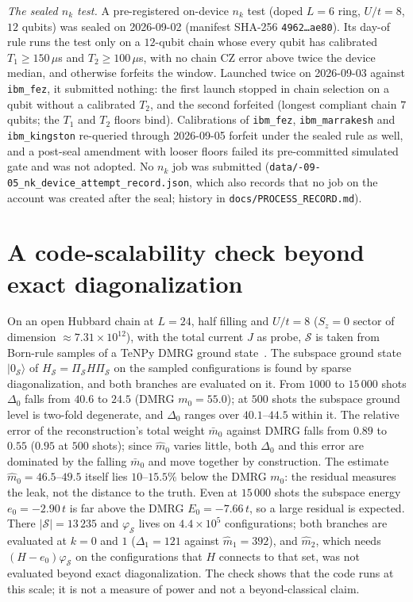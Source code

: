 \documentclass[aps,prb,onecolumn,superscriptaddress,longbibliography,floatfix]{revtex4-2}
\begin{document}
\emph{The sealed $n_k$ test.} A pre-registered on-device $n_k$ test (doped $L=6$ ring, $U/t=8$, $12$ qubits) was sealed on 2026-09-02 (manifest SHA-256 \texttt{4962\ldots ae80}). Its day-of rule runs the test only on a $12$-qubit chain whose every qubit has calibrated $T_1\ge150\,\mu$s and $T_2\ge100\,\mu$s, with no chain CZ error above twice the device median, and otherwise forfeits the window. Launched twice on 2026-09-03 against \texttt{ibm\_fez}, it submitted nothing: the first launch stopped in chain selection on a qubit without a calibrated $T_2$, and the second forfeited (longest compliant chain $7$ qubits; the $T_1$ and $T_2$ floors bind). Calibrations of \texttt{ibm\_fez}, \texttt{ibm\_marrakesh} and \texttt{ibm\_kingston} re-queried through 2026-09-05 forfeit under the sealed rule as well, and a post-seal amendment with looser floors failed its pre-committed simulated gate and was not adopted. No $n_k$ job was submitted (\texttt{data/-09-05\_nk\_device\_\allowbreak attempt\_record.json}, which also records that no job on the account was created after the seal; history in \texttt{docs/\allowbreak PROCESS\_RECORD.md}).

\section{A code-scalability check beyond exact diagonalization}
\label{app:L24}
\label{sec:L24}
On an open Hubbard chain at $L=24$, half filling and $U/t=8$ ($S_z=0$ sector of dimension ${\approx}7.31\times10^{12}$), with the total current $J$ as probe, $\mathcal S$ is taken from Born-rule samples of a TeNPy DMRG ground state~\cite{TeNPy2024}. The subspace ground state $|0_\mathcal S\rangle$ of $H_\mathcal S=\Pi_\mathcal S H\Pi_\mathcal S$ on the sampled configurations is found by sparse diagonalization, and both branches are evaluated on it. From $1000$ to $15\,000$ shots $\Delta_0$ falls from $40.6$ to $24.5$ (DMRG $m_0=55.0$); at $500$ shots the subspace ground level is two-fold degenerate, and $\Delta_0$ ranges over $40.1$--$44.5$ within it. The relative error of the reconstruction's total weight $\bar m_0$ against DMRG falls from $0.89$ to $0.55$ ($0.95$ at $500$ shots); since $\widehat m_0$ varies little, both $\Delta_0$ and this error are dominated by the falling $\bar m_0$ and move together by construction. The estimate $\widehat m_0=46.5$--$49.5$ itself lies $10$--$15.5\%$ below the DMRG $m_0$: the residual measures the leak, not the distance to the truth. Even at $15\,000$ shots the subspace energy $e_0=-2.90\,t$ is far above the DMRG $E_0=-7.66\,t$, so a large residual is expected. There $|\mathcal S|=13\,235$ and $\varphi_\mathcal S$ lives on $4.4\times10^5$ configurations; both branches are evaluated at $k=0$ and $1$ ($\Delta_1=121$ against $\widehat m_1=392$), and $\widehat m_2$, which needs $(H-e_0)\varphi_\mathcal S$ on the configurations that $H$ connects to that set, was not evaluated beyond exact diagonalization. The check shows that the code runs at this scale; it is not a measure of power and not a beyond-classical claim.
\end{document}
